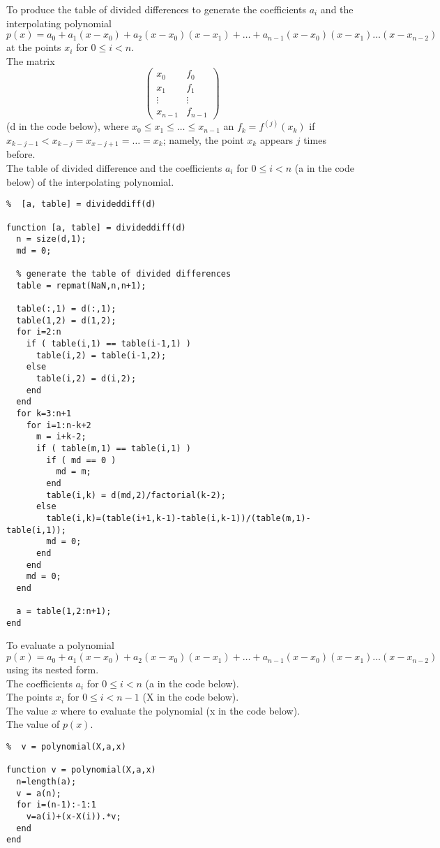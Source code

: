 \begin{code}
To produce the table of divided differences to generate the coefficients
$a_i$ and the interpolating polynomial
\[
  p(x) = a_0 + a_1(x-x_0) + a_2(x-x_0)(x-x_1) + \ldots
  + a_{n-1}(x-x_0)(x-x_1)\ldots(x-x_{n-2})
\]
at the points $x_i$ for $0 \leq i < n$.\\
 The matrix
\[
  \begin{pmatrix}
    x_0 & f_0 \\
    x_1 & f_1 \\
    \vdots & \vdots \\
    x_{n-1} & f_{n-1}
  \end{pmatrix}
\]
(d in the code below), where $x_0 \leq x_1 \leq \ldots \leq x_{n-1}$ an
$f_k = f^{(j)}(x_k)$ if $x_{k-j-1} < x_{k-j} = x_{x-j+1} = \ldots = x_k$;
namely, the point $x_k$ appears $j$ times before. \\
 The table of divided difference and the coefficients 
$a_i$ for $0\leq i < n$ (a in the code below) of the interpolating
polynomial.
\small
\begin{verbatim}
%  [a, table] = divideddiff(d)

function [a, table] = divideddiff(d)
  n = size(d,1);
  md = 0;
  
  % generate the table of divided differences
  table = repmat(NaN,n,n+1);

  table(:,1) = d(:,1);
  table(1,2) = d(1,2);
  for i=2:n
    if ( table(i,1) == table(i-1,1) )
      table(i,2) = table(i-1,2);
    else
      table(i,2) = d(i,2);
    end
  end
  for k=3:n+1
    for i=1:n-k+2
      m = i+k-2;
      if ( table(m,1) == table(i,1) )
        if ( md == 0 )
          md = m;
        end
        table(i,k) = d(md,2)/factorial(k-2);
      else 
        table(i,k)=(table(i+1,k-1)-table(i,k-1))/(table(m,1)-table(i,1));
        md = 0;
      end
    end
    md = 0;
  end

  a = table(1,2:n+1);
end
\end{verbatim}
\end{code}

\begin{code}
To evaluate a polynomial
\[
  p(x) = a_0 + a_1(x-x_0) + a_2(x-x_0)(x-x_1) + \ldots
  + a_{n-1}(x-x_0)(x-x_1)\ldots(x-x_{n-2})
\]
using its nested form.\\
The coefficients $a_i$ for $0 \leq i < n$ (a in the code below).\\
The points $x_i$ for $0 \leq i < n-1$ (X in the code below).\\
The value $x$ where to evaluate the polynomial (x in the code below).\\
 The value of $p(x)$.
\small
\begin{verbatim}
%  v = polynomial(X,a,x)

function v = polynomial(X,a,x)
  n=length(a);
  v = a(n);
  for i=(n-1):-1:1
    v=a(i)+(x-X(i)).*v;
  end
end
\end{verbatim}
\end{code}

